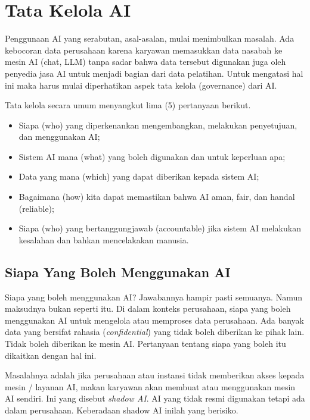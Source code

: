 \chapter{Tata Kelola AI}
Penggunaan AI yang serabutan, asal-asalan, mulai menimbulkan masalah.
Ada kebocoran data perusahaan karena karyawan memasukkan data nasabah
ke mesin AI (chat, LLM) tanpa sadar bahwa data tersebut digunakan juga
oleh penyedia jasa AI untuk menjadi bagian dari data pelatihan.
Untuk mengatasi hal ini maka harus mulai diperhatikan aspek tata kelola
(governance) dari AI.

Tata kelola secara umum menyangkut lima (5) pertanyaan berikut.
\begin{itemize}
\item Siapa (who)
   yang diperkenankan mengembangkan, melakukan penyetujuan,
   dan menggunakan AI;
\item Sistem AI mana 
   (what) yang boleh digunakan dan untuk keperluan apa;
\item Data yang mana (which)
   yang dapat diberikan kepada sistem AI;
\item Bagaimana (how) kita dapat memastikan bahwa AI aman,
   fair, dan handal (reliable);
\item Siapa (who) yang bertanggungjawab (accountable)
   jika sistem AI melakukan kesalahan dan bahkan
   mencelakakan manusia.
\end{itemize}

\section{Siapa Yang Boleh Menggunakan AI}
Siapa yang boleh menggunakan AI? Jawabannya hampir pasti semuanya.
Namun maksudnya bukan seperti itu.
Di dalam konteks perusahaan, siapa yang boleh menggunakan AI untuk
mengelola atau memproses data perusahaan.
Ada banyak data yang bersifat rahasia (\emph{confidential}) yang tidak
boleh diberikan ke pihak lain. Tidak boleh diberikan ke mesin AI.
Pertanyaan tentang siapa yang boleh itu dikaitkan dengan hal ini.

Masalahnya adalah jika perusahaan atau instansi tidak memberikan akses
kepada mesin / layanan AI, makan karyawan akan membuat atau menggunakan
mesin AI sendiri. Ini yang disebut \emph{shadow AI}.
AI yang tidak resmi digunakan tetapi ada dalam perusahaan.
Keberadaan shadow AI inilah yang berisiko.
